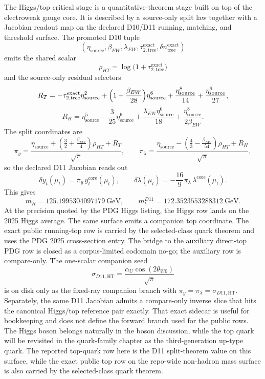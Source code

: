 \documentclass[11pt]{article}
\begin{document}
The Higgs/top critical stage is a quantitative-theorem stage built on top of the electroweak gauge core.
It is described by a source-only split law together with a Jacobian readout map on the declared D10/D11 running, matching, and threshold surface. The promoted D10 tuple
\[
(\eta_{\mathrm{source}},\beta_{EW},\lambda_{EW},\tau_{2,\mathrm{tree}}^{\mathrm{exact}},\delta n_{\mathrm{tree}}^{\mathrm{exact}})
\]
emits the shared scalar
\[
\rho_{HT}=\log\!\bigl(1+\tau_{2,\mathrm{tree}}^{\mathrm{exact}}\bigr)
\]
and the source-only residual selectors
\[
R_T=
-\tau_{2,\mathrm{tree}}^{\mathrm{exact}}\eta_{\mathrm{source}}^2
+\Bigl(1+\frac{\beta_{EW}}{28}\Bigr)\eta_{\mathrm{source}}^6
+\frac{\eta_{\mathrm{source}}^8}{14}
+\frac{\eta_{\mathrm{source}}^9}{27},
\]
\[
R_H=
\eta_{\mathrm{source}}^5
-\frac{3}{25}\eta_{\mathrm{source}}^6
+\frac{\lambda_{EW}\eta_{\mathrm{source}}^6}{18}
+\frac{\eta_{\mathrm{source}}^8}{2\beta_{EW}}.
\]
The split coordinates are
\[
\pi_y=
\frac{\eta_{\mathrm{source}}+\left(\frac32+\frac{\beta_{EW}}4\right)\rho_{HT}+R_T}{\sqrt{\pi}},
\qquad
\pi_\lambda=
\frac{\eta_{\mathrm{source}}-\left(\frac43-\frac{\beta_{EW}}{54}\right)\rho_{HT}+R_H}{\sqrt{\pi}},
\]
so the declared D11 Jacobian reads out
\[
\delta y_t(\mu_t)=\pi_y\,y_t^{\mathrm{core}}(\mu_t),
\qquad
\delta\lambda(\mu_t)=-\frac{16}{9}\pi_\lambda\,\lambda^{\mathrm{core}}(\mu_t).
\]
This gives
\[
m_H = 125.1995304097179~\mathrm{GeV},
\qquad
m_t^{D11} = 172.3523553288312~\mathrm{GeV}.
\]
At the precision quoted by the PDG Higgs listing, the Higgs row lands on the 2025 Higgs average. The
same surface emits a companion top coordinate. The exact public running-top row is carried by the
selected-class quark theorem and uses the PDG 2025 cross-section entry. The bridge to the auxiliary
direct-top PDG row is closed as a corpus-limited codomain no-go; the auxiliary row is compare-only.
The one-scalar companion seed
\[
\sigma_{D11,\mathrm{HT}}=\frac{\alpha_U\cos(2\theta_{W0})}{\sqrt{\pi}}
\]
is on disk only as the fixed-ray companion branch with \(\pi_y=\pi_\lambda=\sigma_{D11,\mathrm{HT}}\).
Separately, the same D11 Jacobian admits a compare-only inverse slice that hits the canonical
Higgs/top reference pair exactly. That exact sidecar is useful for bookkeeping and does not define
the forward branch used for the public rows.
The Higgs boson belongs naturally in the boson discussion, while the top quark will be revisited
in the quark-family chapter as the third-generation up-type quark. The reported top-quark row here is
the D11 split-theorem value on this surface, while the exact public top row on the repo-wide non-hadron mass surface is also carried by the selected-class quark theorem.
\end{document}
